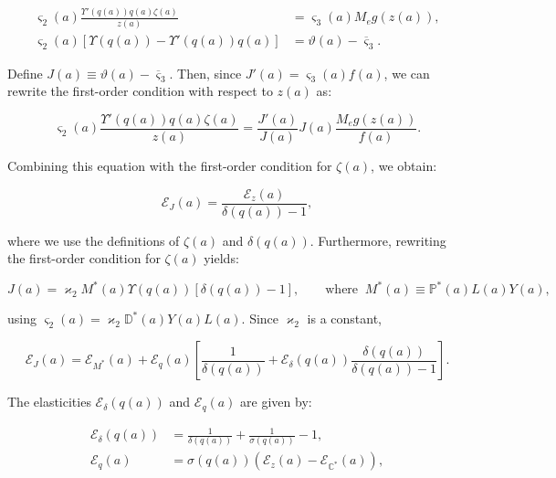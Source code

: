 \begin{align*}
	\varsigma_2(a) \frac{\Upsilon'(q(a)) q(a) \zeta(a)}{z(a)} & = \varsigma_3(a) M_e g(z(a)),\\
	\varsigma_2(a) \left[\Upsilon(q(a)) - \Upsilon'(q(a)) q(a)\right] & = \vartheta(a) - \overline{\varsigma}_3.
\end{align*}

Define $J(a) \equiv \vartheta(a) - \overline{\varsigma}_3$. Then, since $J'(a) = \varsigma_3(a) f(a)$, we can rewrite the first-order condition with respect to $z(a)$ as:

\begin{equation*}
	\varsigma_2(a) \frac{\Upsilon'(q(a)) q(a) \zeta(a)}{z(a)}  = \frac{J'(a)}{J(a)} J(a) \frac{M_e g(z(a))}{f(a)}.
\end{equation*}

Combining this equation with the first-order condition for $\zeta(a)$, we obtain:

\begin{equation}\label{eq:elJ1}
	\mathcal{E}_J(a) =  \frac{\mathcal{E}_z(a)}{\delta(q(a)) -1},
\end{equation}

where we use the definitions of $\zeta(a)$ and $\delta(q(a))$. Furthermore, rewriting the first-order condition for $\zeta(a)$ yields:

\begin{equation}\label{eq:shadowJ}
J(a)  = \varkappa_2 M^*(a) \Upsilon(q(a)) \left[\delta(q(a)) - 1\right], \qquad \text{where} \;\; M^*(a) \equiv \mathbb{P}^*(a) L(a) Y(a),
\end{equation}

using $\varsigma_2(a) = \varkappa_2 \mathbb{D}^*(a) Y(a) L(a)$. Since $\varkappa_2$ is a constant, 

\begin{equation*}
	\mathcal{E}_J(a)  = \mathcal{E}_{M^*}(a) + \mathcal{E}_q(a)\left[\frac{1}{\delta(q(a))} + \mathcal{E}_{\delta}(q(a)) \frac{\delta(q(a))}{\delta(q(a)) - 1}\right].
\end{equation*}

The elasticities $\mathcal{E}_{\delta}(q(a))$ and $\mathcal{E}_q(a)$ are given by: 

\begin{align}
	\mathcal{E}_{\delta}(q(a)) & = \frac{1}{\delta(q(a))} + \frac{1}{\sigma(q(a))} - 1, \label{eq:elastdelta} \\
	\mathcal{E}_{q}(a)         & = \sigma(q(a)) \left(\mathcal{E}_z(a) - \mathcal{E}_{\mathbb{C}^*}(a) \right), \label{eq:elastqdec}
\end{align}

